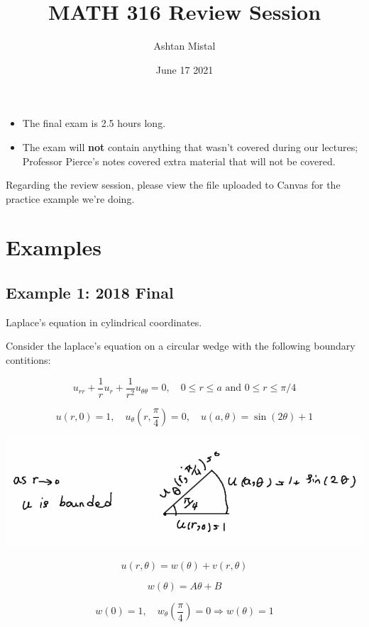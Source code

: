 \documentclass{article}
\title{MATH 316 Review Session}
\author{Ashtan Mistal}
\date{June 17 2021}
\begin{document}
\ifstandalone
\maketitle
\fi

\graphicspath{{./Lecture20/}}


\begin{itemize}
    \item The final exam is 2.5 hours long.
    \item The exam will \textbf{not} contain anything that wasn't covered during our lectures; Professor Pierce's notes covered extra material that will not be covered. 
\end{itemize}

Regarding the review session, please view the file uploaded to Canvas for the practice example we're doing. 

\section{Examples}

\subsection{Example 1: 2018 Final}

Laplace's equation in cylindrical coordinates. 

Consider the laplace's equation on a circular wedge with the following boundary contitions:

$$u_{rr} + \frac{1}{r} u_r + \frac{1}{r^2} u_{\theta \theta} = 0, \quad 0 \leq r \leq a \text{ and } 0 \leq r \leq \pi/4$$

$$u(r,0) = 1, \quad u_{\theta}(r, \frac{\pi}{4}) = 0, \quad u(a, \theta) = \sin(2 \theta) + 1$$

\begin{center}
    \includegraphics[width = 0.7 \textwidth]{1.png}
\end{center}

$$u(r, \theta) = w(\theta) + v(r, \theta)$$

$$w(\theta) = A \theta + B$$

$$w(0) = 1, \quad w_{\theta} (\frac{\pi}{4}) = 0 \Rightarrow w(\theta) = 1$$
\end{document}
